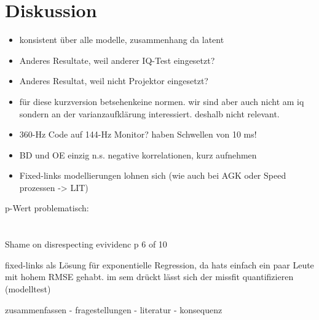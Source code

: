 \documentclass[11pt, twoside, a4paper]{book}		%
\begin{document}
\chapter{Diskussion \label{cha:Diskussion}}
\begin{itemize}
	\item konsistent über alle modelle, zusammenhang da latent
	\item Anderes Resultate, weil anderer IQ-Test eingesetzt?
	\item Anderes Resultat, weil nicht Projektor eingesetzt?
	\item für diese kurzversion betsehenkeine normen. wir sind aber auch nicht am iq sondern an der varianzaufklärung interessiert. deshalb nicht relevant.
	\item 360-Hz Code auf 144-Hz Monitor? \citet{Lappin2009, Tadin2006} haben Schwellen von 10 ms!
	\item BD und OE einzig n.s. negative korrelationen, kurz aufnehmen
	\item Fixed-links modellierungen lohnen sich (wie auch bei AGK oder Speed prozessen -> LIT)
\end{itemize}


p-Wert problematisch:\\
\citet{Gelman2006}\\
\citet{Wasserstein2016}\\
\citet{Nuzzo2014}
\citet{Hayduk2014} Shame on disrespecting evividenc p 6 of 10


fixed-links als Lösung für exponentielle Regression, da hats einfach ein paar Leute mit hohem RMSE gehabt. im sem drückt lässt sich der missfit quantifizieren (modelltest)



zusammenfassen
- fragestellungen
- literatur
- konsequenz

\printglossaries	%


\renewcommand\bibname{Literatur}				%
\end{document}
